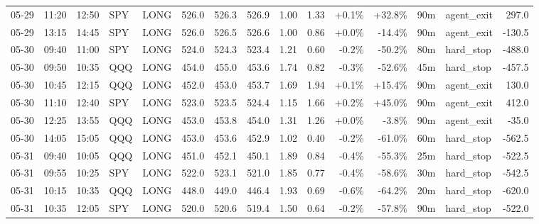 \documentclass[11pt,a4paper,twoside]{article}
\begin{document}
\begin{landscape}
\begin{center}
\begin{longtable}{>{\color{txtmain}}l l l l l r r r r r r r r >{\color{txtmain}}l r}
05-29 & 11:20 & 12:50 & SPY & LONG & 526.0 & 526.3 & 526.9 & 1.00 & 1.33 & \textcolor{wingreen}{+0.1\%} & \textcolor{wingreen}{+32.8\%} & 90m & agent\_exit & \textcolor{wingreen}{297.0} \\
05-29 & 13:15 & 14:45 & SPY & LONG & 526.0 & 526.5 & 526.6 & 1.00 & 0.86 & \textcolor{wingreen}{+0.0\%} & \textcolor{lossred}{-14.4\%} & 90m & agent\_exit & \textcolor{lossred}{-130.5} \\
05-30 & 09:40 & 11:00 & SPY & LONG & 524.0 & 524.3 & 523.4 & 1.21 & 0.60 & \textcolor{lossred}{-0.2\%} & \textcolor{lossred}{-50.2\%} & 80m & hard\_stop & \textcolor{lossred}{-488.0} \\
05-30 & 09:50 & 10:35 & QQQ & LONG & 454.0 & 455.0 & 453.6 & 1.74 & 0.82 & \textcolor{lossred}{-0.3\%} & \textcolor{lossred}{-52.6\%} & 45m & hard\_stop & \textcolor{lossred}{-457.5} \\
05-30 & 10:45 & 12:15 & QQQ & LONG & 452.0 & 453.0 & 453.7 & 1.69 & 1.94 & \textcolor{wingreen}{+0.1\%} & \textcolor{wingreen}{+15.4\%} & 90m & agent\_exit & \textcolor{wingreen}{130.0} \\
05-30 & 11:10 & 12:40 & SPY & LONG & 523.0 & 523.5 & 524.4 & 1.15 & 1.66 & \textcolor{wingreen}{+0.2\%} & \textcolor{wingreen}{+45.0\%} & 90m & agent\_exit & \textcolor{wingreen}{412.0} \\
05-30 & 12:25 & 13:55 & QQQ & LONG & 453.0 & 453.8 & 454.0 & 1.31 & 1.26 & \textcolor{wingreen}{+0.0\%} & \textcolor{lossred}{-3.8\%} & 90m & agent\_exit & \textcolor{lossred}{-35.0} \\
05-30 & 14:05 & 15:05 & QQQ & LONG & 453.0 & 453.6 & 452.9 & 1.02 & 0.40 & \textcolor{lossred}{-0.2\%} & \textcolor{lossred}{-61.0\%} & 60m & hard\_stop & \textcolor{lossred}{-562.5} \\
05-31 & 09:40 & 10:05 & QQQ & LONG & 451.0 & 452.1 & 450.1 & 1.89 & 0.84 & \textcolor{lossred}{-0.4\%} & \textcolor{lossred}{-55.3\%} & 25m & hard\_stop & \textcolor{lossred}{-522.5} \\
05-31 & 09:55 & 10:25 & SPY & LONG & 522.0 & 523.1 & 521.0 & 1.85 & 0.77 & \textcolor{lossred}{-0.4\%} & \textcolor{lossred}{-58.6\%} & 30m & hard\_stop & \textcolor{lossred}{-542.5} \\
05-31 & 10:15 & 10:35 & QQQ & LONG & 448.0 & 449.0 & 446.4 & 1.93 & 0.69 & \textcolor{lossred}{-0.6\%} & \textcolor{lossred}{-64.2\%} & 20m & hard\_stop & \textcolor{lossred}{-620.0} \\
05-31 & 10:35 & 12:05 & SPY & LONG & 520.0 & 520.6 & 519.4 & 1.50 & 0.64 & \textcolor{lossred}{-0.2\%} & \textcolor{lossred}{-57.8\%} & 90m & hard\_stop & \textcolor{lossred}{-522.0} \\

\end{longtable}
\end{center}
\end{landscape}
\end{document}
